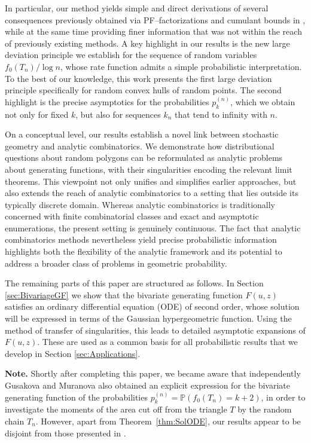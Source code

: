 \documentclass[11pt,a4paper]{article}
\numberwithin{equation}{section}
\def\PP{\mathbb{P}}
\begin{document}
In particular, our method yields simple and direct derivations of several consequences previously obtained via PF–factorizations and cumulant bounds in \cite{GT:2021}, while at the same time providing finer information that was not within the reach of previously existing methods. A key highlight in our results is the new large deviation principle we establish for the sequence of random variables $f_0(T_n)/\log n$, whose rate function admits a simple probabilistic interpretation. 
To the best of our knowledge, this work presents the first large deviation principle specifically for random convex hulls of random points.
The second highlight is the precise asymptotics for the probabilities $p_k^{(n)}$, which we obtain not only for fixed $k$, but also for sequences $k_n$ that tend to infinity with $n$.

On a conceptual level, our results establish a novel link between stochastic geometry and analytic combinatorics. We demonstrate how distributional questions about random polygons can be reformulated as analytic problems about generating functions, with their singularities encoding the relevant limit theorems. This viewpoint not only unifies and simplifies earlier approaches, but also extends the reach of analytic combinatorics to a setting that lies outside its typically discrete domain. Whereas analytic combinatorics is traditionally concerned with finite combinatorial classes and exact and asymptotic enumerations, the present setting is genuinely continuous. The fact that analytic combinatorics methods nevertheless yield precise probabilistic information highlights both the flexibility of the analytic framework and its potential to address a broader class of problems in geometric probability.

\medskip

The remaining parts of this paper are structured as follows. In Section \ref{sec:BivariageGF} we show that the bivariate generating function $F(u,z)$ satisfies an ordinary differential equation (ODE) of second order, whose solution will be expressed in terms of the Gaussian hypergeometric function. Using the method of transfer of singularities, this leads to detailed asymptotic expansions of $F(u,z)$. These are used as a common basis for all probabilistic results that we develop in Section \ref{sec:Applications}.

\medskip

\textbf{Note.} Shortly after completing this paper, we became aware that independently Gusakova and Muranova \cite{GusMur} also obtained an explicit expression for the bivariate generating function of the probabilities $p_k^{(n)}=\PP(f_0(T_n)=k+2)$, in order to investigate the moments of the area cut off from the triangle $T$ by the random chain $T_n$. However, apart from Theorem~\ref{thm:SolODE}, our results appear to be disjoint from those presented in \cite{GusMur}.
\end{document}
